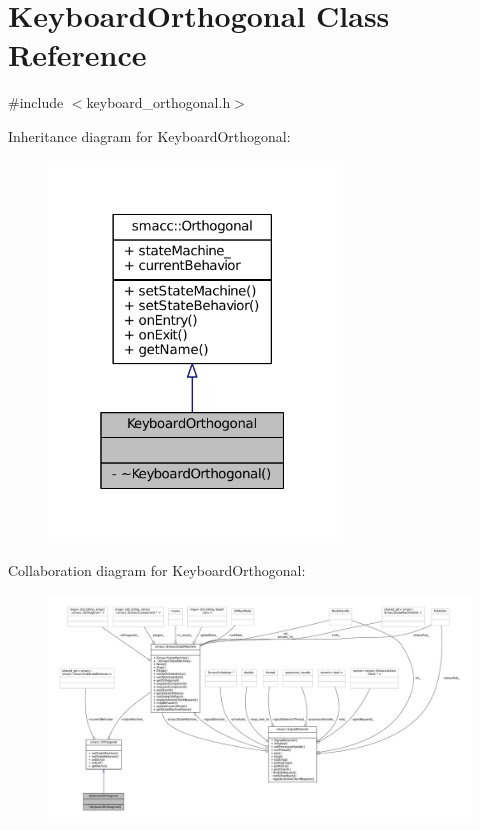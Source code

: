 \hypertarget{classKeyboardOrthogonal}{}\section{Keyboard\+Orthogonal Class Reference}
\label{classKeyboardOrthogonal}


{\ttfamily \#include $<$keyboard\+\_\+orthogonal.\+h$>$}



Inheritance diagram for Keyboard\+Orthogonal\+:
\nopagebreak
\begin{figure}[H]
\begin{center}
\leavevmode
\includegraphics[width=217pt]{classKeyboardOrthogonal__inherit__graph}
\end{center}
\end{figure}


Collaboration diagram for Keyboard\+Orthogonal\+:
\nopagebreak
\begin{figure}[H]
\begin{center}
\leavevmode
\includegraphics[width=350pt]{classKeyboardOrthogonal__coll__graph}
\end{center}
\end{figure}
